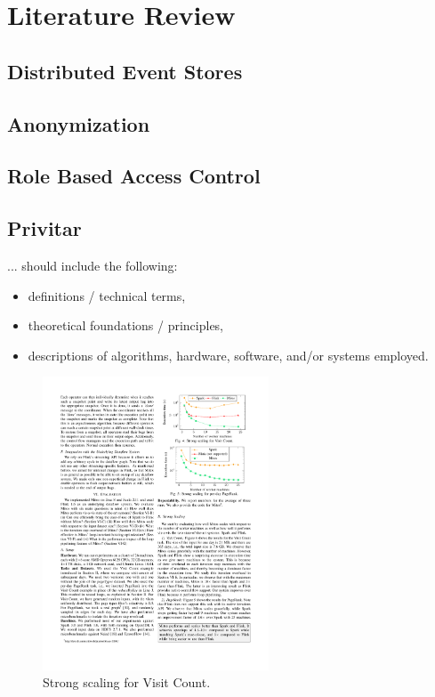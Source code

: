 \chapter{Literature Review\label{cha:chapter2}}

\section{Distributed Event Stores}

\section{Anonymization}

\section{Role Based Access Control}

\section{Privitar}

... should include the following:
\begin{itemize}
    \item definitions / technical terms,
    \item theoretical foundations / principles,
    \item descriptions of algorithms, hardware, software, and/or systems employed.
\end{itemize}



\begin{figure}[h]
\centering
\includegraphics[width=0.6\textwidth]{./img/strong_scaling.pdf}
\caption{Strong scaling for Visit Count\cite{GevayRBMQM21}.}
\end{figure}




